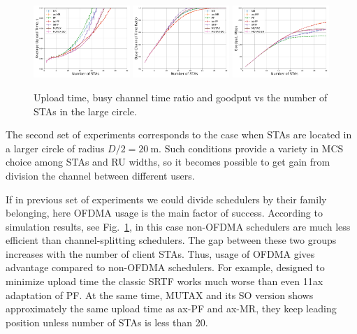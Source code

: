 \begin{figure}[bt]
  \centering
  \includegraphics[width = 0.325\textwidth]{20-d.pdf}
  \includegraphics[width = 0.325\textwidth]{20-e.pdf}
  \includegraphics[width = 0.325\textwidth]{20-t.pdf}
  \caption{\label{fig:20metres} Upload time, busy channel time ratio and goodput vs the number of STAs in the large circle.}
\end{figure}

The second set of experiments corresponds to the case when STAs are located in a larger circle of radius $D/2 = \SI{20}{\m}$.
Such conditions provide a variety in MCS choice among STAs and RU widths, so it becomes possible to get gain from division the channel between different users.

If in previous set of experiments we could divide schedulers by their family belonging, here OFDMA usage is the main factor of success.
According to simulation results, see Fig.~\ref{fig:20metres}, in this case non-OFDMA schedulers are  much less efficient than channel-splitting schedulers. 
The gap between these two groups increases with the number of client STAs. 
Thus, usage of OFDMA gives advantage compared to non-OFDMA schedulers. 
For example, designed to minimize upload time the classic SRTF works much worse than even 11ax adaptation of PF. 
At the same time, MUTAX and its SO version shows approximately the same upload time as ax-PF and ax-MR, they keep leading position unless number of STAs is less than 20.  

